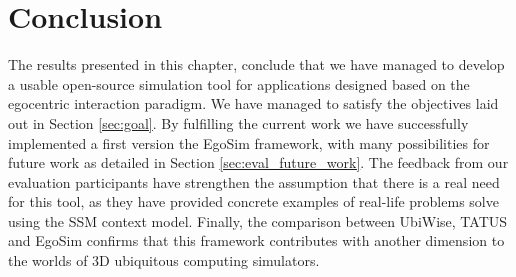 \section{Conclusion} %
\label{sec:eval_conclusion}
The results presented in this chapter, conclude that we have managed to develop a usable open-source simulation tool for applications designed based on the egocentric interaction paradigm. We have managed to satisfy the objectives laid out in Section \ref{sec:goal}. By fulfilling the current work we have successfully implemented a first version the EgoSim framework, with many possibilities for future work as detailed in Section \ref{sec:eval_future_work}. The feedback from our evaluation participants have strengthen the assumption that there is a real need for this tool, as they have provided concrete examples of real-life problems solve using the SSM context model. Finally, the comparison between UbiWise, TATUS and EgoSim confirms that this framework contributes with another dimension to the worlds of 3D ubiquitous computing simulators.
